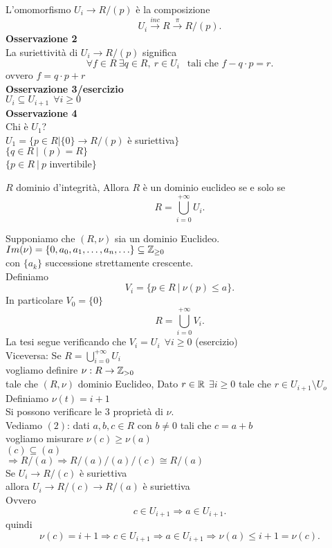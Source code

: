 \documentclass[12px]{article}
\begin{document}
 L'omomorfismo $U_i \rightarrow R/(p)$ è la composizione\\
 \[
	 U_i \xrightarrow{inc} R \xrightarrow{\pi} R/(p)
 .\] 
 \textbf{Osservazione 2}\\
 La suriettività di $U_i \rightarrow R/(p)$ significa 
 \[
	 \forall f\in R \ \exists q\in R, \ r \in U_i\ \ \text{ tali che } f - q\cdot p = r
 .\] 
 ovvero $f = q \cdot p + r$ \\
 \textbf{Osservazione 3/esercizio}\\
 $U_i\subseteq U_{i+1} \ \ \forall i\geq 0$ \\
 \textbf{Osservazione 4}\\
 Chi è $U_1$?\\
 $U_1 = \{p\in R | \{0\} \rightarrow R/(p)$ è suriettiva$\}$\\
 $\{q\in R \  | \ (p) = R\}$ \\
 $\{p\in R \ | \ p$ invertibile$\}$\\
 \begin{teo}
	 $R$ dominio d'integrità, Allora $R$ è un dominio euclideo se e solo se \[R = \bigcup^{+\infty}_{i=0}U_i.\]
 \end{teo}
 \begin{dimo}
 	Supponiamo che $(R,\nu)$ sia un dominio Euclideo.\\
	$Im(\nu) = \{0,a_0,a_1,\ldots,a_n,\ldots\}\subseteq\mathbb{Z}_{\geq0}$\\
con $\{a_k\}$ successione strettamente crescente.\\
Definiamo
\[
	V_i = \{p\in R  \ | \ \nu(p) \leq a \}
.\] 
In particolare $V_0 = \{0\}$\\
\[
R = \bigcup^{+\infty}_{i =0 }V_i
.\] 
La tesi segue verificando che $V_i = U_i \ \ \forall i\geq 0$ (esercizio)\\
Viceversa: Se $R = \bigcup^{+\infty}_{i =0}U_i$\\
vogliamo definire $\nu: R \rightarrow\mathbb{Z}_{>0}$\\
tale che $(R,\nu)$ dominio Euclideo, Dato $r\in \mathbb{R}$  $\exists i\geq 0$ tale che $r\in U_{i+1}\setminus U_o$ \\
Definiamo $\nu(t) = i+1$ \\
Si possono verificare le 3 proprietà di $\nu$.\\
Vediamo $(2)$: dati  $a,b,c\in R$ con  $b\neq 0$ tali che  $c = a + b$\\
vogliamo misurare  $\nu(c) \geq \nu(a)$\\
 $(c)\subseteq(a)$\\
  $ \Rightarrow R/(a) \Rightarrow R/(a)/(a)/(c)\cong R/(a)$ \\
  Se $U_i \rightarrow R/(c)$ è suriettiva\\
  allora $U_i \rightarrow R/(c) \rightarrow R/(a)$ è suriettiva\\
  Ovvero
  \[
	  c\in U_{i+1} \Rightarrow a\in U_{i+1}
  .\] 
  quindi 
   \[
	   \nu(c) = i + 1 \Rightarrow  c \in U_{i+1} \Rightarrow a\in U_{i+1} \Rightarrow \nu(a)\leq i+1 = \nu(c)
  .\] 
 \end{dimo}
\end{document}
